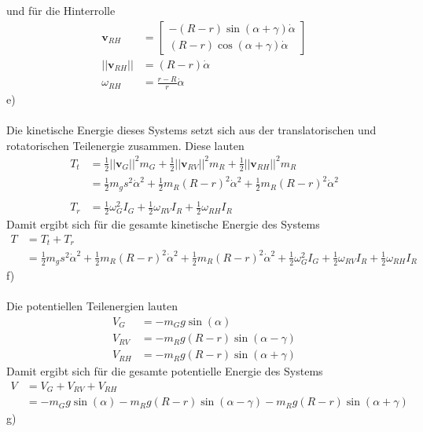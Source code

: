 und für die Hinterrolle
\begin{align*}
	\textbf{v}_{RH} &= \begin{bmatrix}
	-(R - r)\sin(\alpha + \gamma)\dot{\alpha} \\
	(R - r)\cos(\alpha + \gamma)\dot{\alpha}	
	\end{bmatrix}
	\\
	||\textbf{v}_{RH}|| &= (R - r)\dot{\alpha} \\
	\omega_{RH} &= \frac{r - R}{r}\dot{\alpha}
\end{align*}
e)\\ \\
Die kinetische Energie dieses Systems setzt sich aus der translatorischen und rotatorischen Teilenergie zusammen. Diese lauten
\begin{align*}
	T_t &= \frac{1}{2}||\textbf{v}_G||^2m_G + \frac{1}{2}||\textbf{v}_{RV}||^2m_R +\frac{1}{2}||\textbf{v}_{RH}||^2m_R \\
	&= \frac{1}{2}m_gs^2\dot{\alpha}^2 + \frac{1}{2}m_R(R - r)^2\dot{\alpha}^2 + \frac{1}{2}m_R(R - r)^2\dot{\alpha}^2 \\ \\
	T_r &= \frac{1}{2}\omega_G^2I_G + \frac{1}{2}\omega_{RV}I_R + \frac{1}{2}\omega_{RH}I_R
\end{align*}
Damit ergibt sich für die gesamte kinetische Energie des Systems
\begin{align*}
	T &= T_t + T_r \\
	  &= \frac{1}{2}m_gs^2\dot{\alpha}^2 + \frac{1}{2}m_R(R - r)^2\dot{\alpha}^2 + \frac{1}{2}m_R(R - r)^2\dot{\alpha}^2 + \frac{1}{2}\omega_G^2I_G + \frac{1}{2}\omega_{RV}I_R + \frac{1}{2}\omega_{RH}I_R
\end{align*}
f)\\ \\
Die potentiellen Teilenergien lauten
\begin{align*}
	V_G &= -m_Gg\sin(\alpha) \\
	V_{RV} &= -m_Rg(R - r)\sin(\alpha -  \gamma) \\
	V_{RH} &= -m_Rg(R - r)\sin(\alpha +  \gamma)
\end{align*}
Damit ergibt sich für die gesamte potentielle Energie des Systems
\begin{align*}
	V &= V_G + V_{RV} + V_{RH} \\
	  &= -m_Gg\sin(\alpha) - m_Rg(R - r)\sin(\alpha -  \gamma) - m_Rg(R - r)\sin(\alpha +  \gamma)
\end{align*}
g)\\ \\
